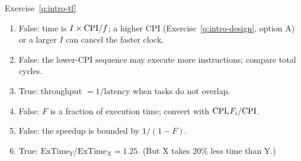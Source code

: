 \begin{noot}{Exercise~\ref{q:intro-tf}}
\begin{enumerate}[label=(\alph*),leftmargin=*]
  \item False: time is $I\times\mathrm{CPI}/f$; a higher CPI (Exercise~\ref{q:intro-design},
  option A) or a larger $I$ can cancel the faster clock.
  \item False: the lower-CPI sequence may execute more instructions; compare
  total cycles.
  \item True: throughput $=1/\text{latency}$ when tasks do not overlap.
  \item False: $F$ is a fraction of execution time; convert with
  $\mathrm{CPI}_iF_i/\mathrm{CPI}$.
  \item False: the speedup is bounded by $1/(1-F)$.
  \item True: $\text{ExTime}_Y/\text{ExTime}_X=1.25$. (But X takes 20\% less
  time than Y.)
\end{enumerate}
\end{noot}

